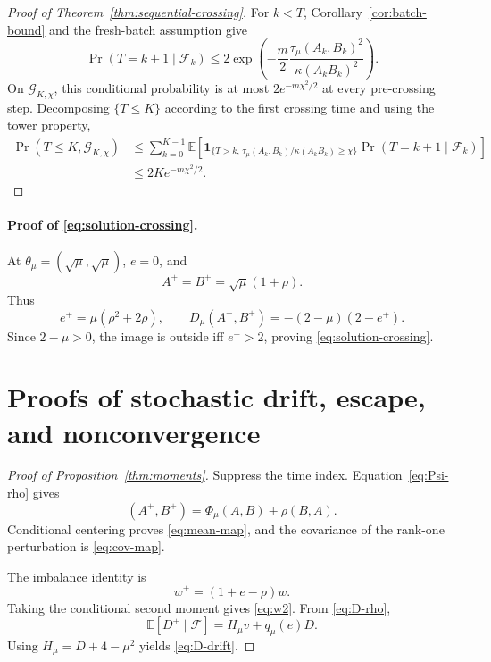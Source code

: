 \documentclass[11pt]{article}
\newcommand{\E}{\mathbb E}
\newcommand{\Fcal}{\mathcal F}
\begin{document}
\begin{proof}[Proof of Theorem~\ref{thm:sequential-crossing}]
For \(k<T\), Corollary~\ref{cor:batch-bound} and the fresh-batch assumption
give
\[
\Pr(T=k+1\mid\Fcal_k)
\le
2\exp\left(
-\frac{m}{2}
\frac{\tau_\mu(A_k,B_k)^2}{\kappa(A_kB_k)^2}
\right).
\]
On \(\mathcal G_{K,\chi}\), this conditional probability is at most
\(2e^{-m\chi^2/2}\) at every pre-crossing step.  Decomposing
\(\{T\le K\}\) according to the first crossing time and using the tower
property,
\begin{align*}
\Pr(T\le K,\mathcal G_{K,\chi})
&\le
\sum_{k=0}^{K-1}
\E\left[
\mathbf 1_{\{T>k,\,
\tau_\mu(A_k,B_k)/\kappa(A_kB_k)\ge\chi\}}
\Pr(T=k+1\mid\Fcal_k)
\right]\\
&\le 2K e^{-m\chi^2/2}.
\end{align*}
\end{proof}

\paragraph{Proof of \eqref{eq:solution-crossing}.}
At \(\theta_\mu=(\sqrt\mu,\sqrt\mu)\), \(e=0\), and
\[
A^+=B^+=\sqrt\mu(1+\rho).
\]
Thus
\[
e^+=\mu(\rho^2+2\rho),
\qquad
D_\mu(A^+,B^+)=-(2-\mu)(2-e^+).
\]
Since \(2-\mu>0\), the image is outside iff \(e^+>2\), proving
\eqref{eq:solution-crossing}.

\section{Proofs of stochastic drift, escape, and nonconvergence}
\label{app:moment-proofs}

\begin{proof}[Proof of Proposition~\ref{thm:moments}]
Suppress the time index.  Equation~\eqref{eq:Psi-rho} gives
\[
(A^+,B^+)
=\Phi_\mu(A,B)+\rho(B,A).
\]
Conditional centering proves \eqref{eq:mean-map}, and the covariance of the
rank-one perturbation is \eqref{eq:cov-map}.

The imbalance identity is
\[
w^+=(1+e-\rho)w.
\]
Taking the conditional second moment gives \eqref{eq:w2}.  From
\eqref{eq:D-rho},
\[
\E[D^+\mid\Fcal]
=H_\mu v+q_\mu(e)D.
\]
Using \(H_\mu=D+4-\mu^2\) yields \eqref{eq:D-drift}.
\end{proof}
\end{document}
